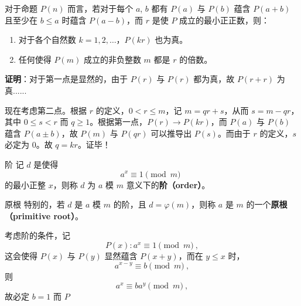 
\begin{lemma}{}
对于命题 $P(n)$ 而言，若对于每个 $a$, $b$ 都有 $P(a)$ 与 $P(b)$ 蕴含 $P(a+b)$ 且至少在 $b \le a$ 时蕴含 $P(a-b)$，而 $r$ 是使 $P$ 成立的最小正正数，则：
\begin{enumerate}
\item 对于各个自然数 $k = 1, 2, \dots$，$P(kr)$ 也为真。
\item 任何使得 $P(m)$ 成立的非负整数 $m$ 都是 $r$ 的倍数。
\end{enumerate}
\end{lemma}
\textbf{证明}：对于第一点是显然的，由于 $P(r)$ 与 $P(r)$ 都为真，故 $P(r+r)$ 为真......

现在考虑第二点。根据 $r$ 的定义，$0 < r \le m$，记 $m = qr + s$，从而 $s = m - qr$，其中 $0 \le s < r$ 而 $q \ge 1$。根据第一点，$P(r) \rightarrow P(kr)$，而 $P(a)$ 与 $P(b)$ 蕴含 $P(a \pm b)$，故 $P(m)$ 与 $P(qr)$ 可以推导出 $P(s)$。而由于 $r$ 的定义，$s$ 必定为 $0$。故 $q = kr$。证毕！


\begin{definition}{阶}
记 $d$ 是使得
\begin{equation}
a^x \equiv 1 \pmod m ~~
\end{equation}
的最小正整 $x$，则称 $d$ 为 $a$ 模 $m$ 意义下的\textbf{阶（order）}。
\end{definition}

\begin{definition}{原根}
特别的，若 $d$ 是 $a$ 模 $m$ 的阶，且 $d = \varphi(m)$，则称 $a$ 是 $m$ 的一个\textbf{原根（primitive root）}。
\end{definition}

考虑阶的条件，记
\begin{equation}
P(x) : a^x \equiv 1 \pmod m ~,
\end{equation}
这会使得 $P(x)$ 与 $P(y)$ 显然蕴含 $P(x+y)$，而在 $y \le x$ 时，
\begin{equation}
a^{x-y} \equiv b \pmod m ~,
\end{equation}
则
\begin{equation}
a^x \equiv b a^y \pmod m ~,
\end{equation}
故必定 $b=1$ 而 $P$
